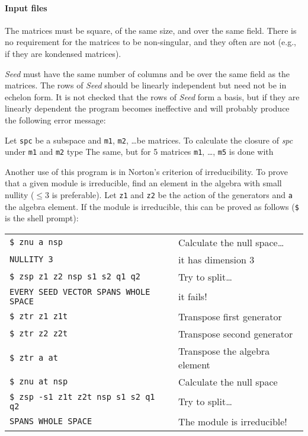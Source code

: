 \paragraph{Input files}
The matrices must be square, of the same size, and over the same
field. There is no requirement
for the matrices to be non-singular, and they often are not (e.g.,
if they are kondensed matrices).

{\it Seed} must have the same number of columns and be over the same
field as the matrices. The rows of {\it Seed} should be linearly
independent but need not be in echelon form. It is not checked that
the rows of {\it Seed} form a basis, but if they are linearly
dependent the program becomes ineffective and will probably produce
the following error message:


\Examples
Let {\tt spc} be a subspace and {\tt m1}, {\tt m2}, \ldots be
matrices. To calculate the closure of {\it spc} under {\tt m1}
and {\tt m2} type
The same, but for 5 matrices {\tt m1}, \ldots, {\tt m5} is done
with

Another use of this program is in Norton's criterion of irreducibility.
To prove that a given module is irreducible, find an element in the
algebra with small nullity ($\leq 3$ is preferable). Let {\tt z1} and
{\tt z2} be the action of the generators and {\tt a} the algebra
element. If the module is irreducible, this can be proved as follows
({\tt \$} is the shell prompt):
\begin{center}
\begin{tabular}{ll}
\verb|$ znu a nsp|	          & Calculate the null space\ldots\\
\verb|NULLITY 3|                  & it has dimension 3\\
\verb|$ zsp z1 z2 nsp s1 s2 q1 q2|  & Try to split\ldots \\
\verb|EVERY SEED VECTOR SPANS WHOLE SPACE| & it fails!\\
\verb|$ ztr z1 z1t|	&  Transpose first generator \\
\verb|$ ztr z2 z2t|	&  Transpose second generator \\
\verb|$ ztr a at|	&  Transpose the algebra element \\
\verb|$ znu at nsp|	& Calculate the null space \\
\verb|$ zsp -s1 z1t z2t nsp s1 s2 q1 q2|  & Try to split\ldots \\
\verb|SPANS WHOLE SPACE| & The module is irreducible!
\end{tabular}
\end{center}


